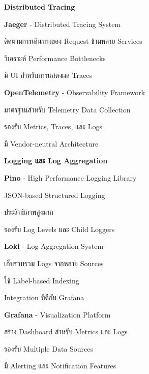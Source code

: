 \vspace{0.5em}
\textbf{Distributed Tracing}
\vspace{0.5em}

\begin{mycustomenum2}
    \item \textbf{Jaeger} - Distributed Tracing System
    \begin{mycustomenum2}
        \item ติดตามการเดินทางของ Request ข้ามหลาย Services
        \item วิเคราะห์ Performance Bottlenecks
        \item มี UI สำหรับการแสดงผล Traces
    \end{mycustomenum2}

    \item \textbf{OpenTelemetry} - Observability Framework
    \begin{mycustomenum2}
        \item มาตรฐานสำหรับ Telemetry Data Collection
        \item รองรับ Metrics, Traces, และ Logs
        \item มี Vendor-neutral Architecture
    \end{mycustomenum2}
\end{mycustomenum2}

\vspace{0.5em}
\textbf{Logging และ Log Aggregation}
\vspace{0.5em}

\begin{mycustomenum2}
    \item \textbf{Pino} - High Performance Logging Library
    \begin{mycustomenum2}
        \item JSON-based Structured Logging
        \item ประสิทธิภาพสูงมาก
        \item รองรับ Log Levels และ Child Loggers
    \end{mycustomenum2}

    \item \textbf{Loki} - Log Aggregation System
    \begin{mycustomenum2}
        \item เก็บรวบรวม Logs จากหลาย Sources
        \item ใช้ Label-based Indexing
        \item Integration ที่ดีกับ Grafana
    \end{mycustomenum2}

    \item \textbf{Grafana} - Visualization Platform
    \begin{mycustomenum2}
        \item สร้าง Dashboard สำหรับ Metrics และ Logs
        \item รองรับ Multiple Data Sources
        \item มี Alerting และ Notification Features
    \end{mycustomenum2}
\end{mycustomenum2}

